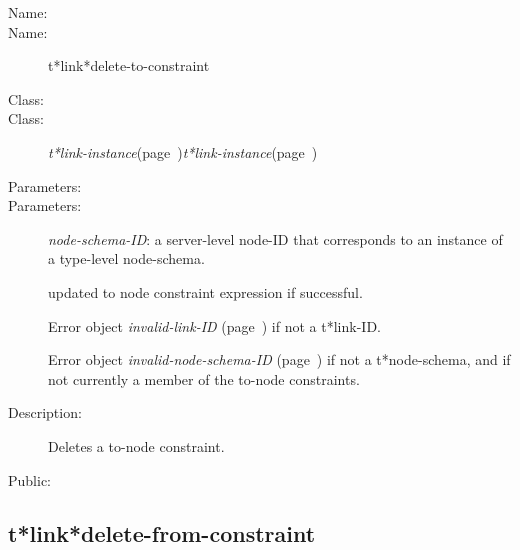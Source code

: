 \begin{description}
\item [Name:]\item [Name:]  t*link*delete-to-constraint

\item [Class:]\item [Class:] {\sl t*link-instance}\hfill(page~\pageref{t*link-instance}){\sl t*link-instance}\hfill(page~\pageref{t*link-instance})

\item [Parameters:]\item [Parameters:]
{\sl node-schema-ID}:  a server-level node-ID that corresponds to an 
instance of a type-level node-schema. 

updated to node constraint expression if successful.

Error object {\sl invalid-link-ID} (page~\pageref{invalid-link-ID}) if not a t*link-ID.

Error object {\sl invalid-node-schema-ID} (page~\pageref{invalid-node-schema-ID}) if not a 
t*node-schema, and if not currently a member of the 
to-node constraints.

\item [Description:]

Deletes a to-node constraint.

\item [Public:]



\end{description}
\horizontalline

\subsection{t*link*delete-from-constraint}
\label{t*link*delete-from-constraint}

